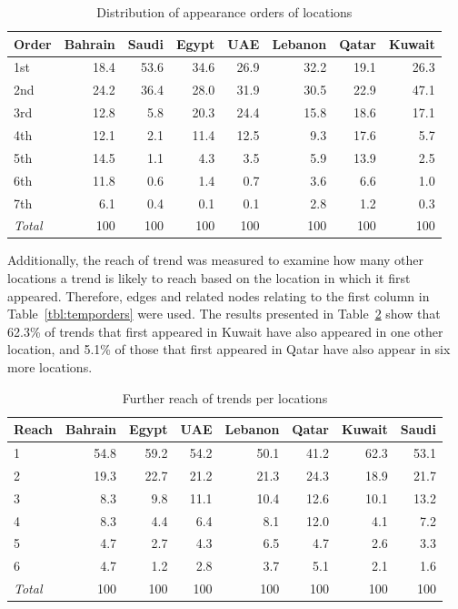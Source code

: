 \documentclass{llncs}
\begin{document}
\begin{table}[!h]
\centering
\caption{Distribution of appearance orders of locations}
\begin{tabular}{@{}lrrrrrrr@{}}
\toprule
Order & Bahrain & Saudi & Egypt & UAE & Lebanon & Qatar & Kuwait \\ 
\midrule
1st &  18.4 & 53.6 & 34.6 & 26.9 & 32.2 & 19.1 & 26.3 \\
2nd & 24.2 & 36.4 & 28.0 & 31.9 & 30.5 & 22.9 & 47.1\\
3rd &  12.8 & 5.8 & 20.3 & 24.4 & 15.8 & 18.6 &  17.1\\
4th &  12.1 & 2.1 & 11.4 & 12.5 & 9.3 & 17.6 & 5.7 \\
5th &  14.5 & 1.1 & 4.3 & 3.5 & 5.9 & 13.9 & 2.5 \\
6th &  11.8 & 0.6 & 1.4 & 0.7 & 3.6 &  6.6 & 1.0 \\
7th &  6.1 & 0.4 & 0.1 & 0.1 & 2.8 &  1.2 &  0.3\\
\midrule
{\emph{Total}} & 100 & 100 & 100 & 100 & 100 &  100 &   100\\
\bottomrule
\end{tabular}
\label{tbl:appearanceorders}
\end{table}

Additionally, the reach of trend was measured to examine how many
other locations a trend is likely to reach based on the location in which
it first appeared. Therefore, edges and related nodes relating to the
first column in Table~\ref{tbl:temporders} were used. The results
presented in Table~\ref{tbl:furtherreach} show that 62.3\% of trends
that first appeared in Kuwait have also appeared in one other location,
and 5.1\% of those that first appeared in Qatar have also appear in
six more locations.

\begin{table}[!h]
\centering
\caption{Further reach of trends per locations}
\begin{tabular}{@{}lrrrrrrr@{}}
\toprule
Reach & Bahrain & Egypt & UAE & Lebanon & Qatar & Kuwait & Saudi \\ 
\midrule
1 &  54.8 & 59.2 & 54.2 & 50.1 & 41.2 & 62.3 & 53.1 \\
2 &  19.3 & 22.7 & 21.2 & 21.3 & 24.3 & 18.9 & 21.7\\
3 &    8.3 & 9.8  & 11.1 & 10.4 & 12.6 & 10.1 & 13.2\\
4 &    8.3 & 4.4 & 6.4 & 8.1 & 12.0 & 4.1 & 7.2 \\
5 &    4.7 & 2.7 & 4.3 & 6.5 & 4.7 & 2.6 & 3.3 \\
6 &    4.7 & 1.2 & 2.8 & 3.7 & 5.1 & 2.1& 1.6\\
\midrule
{\emph{Total}} & 100 & 100 & 100 & 100 & 100 &  100 &   100\\
\bottomrule
\end{tabular}
\label{tbl:furtherreach}
\end{table}
\end{document}
